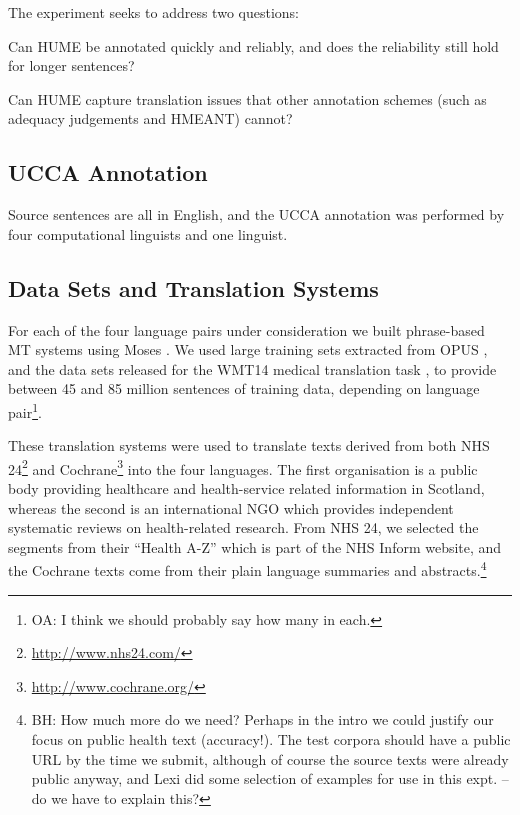 \documentclass[11pt]{article}
\newcommand{\oa}[1]{\footnote{\color{red}OA: #1}}
\newcommand{\bh}[1]{\footnote{\color{blue}BH: #1}}
\begin{document}

The experiment seeks to address two questions:

\begin{compactitem}
\item Can HUME be annotated quickly and reliably, and does the reliability still hold for longer sentences?
\item Can HUME capture translation issues that other annotation schemes (such as
adequacy judgements and HMEANT)
cannot?
\end{compactitem}

\subsection{UCCA Annotation}
Source sentences are all in English, and the UCCA annotation was performed by four
computational linguists and one linguist.

\subsection{Data Sets and Translation Systems}

For each of the four language pairs under consideration  we built phrase-based MT systems
using Moses \cite{Koehn:2007}. We used large training sets extracted from OPUS \cite{tiedemann:2009}, and
the data sets released for the WMT14 medical translation task \cite{bojar-EtAl:2014:W14-33}, to provide between
45 and 85 million sentences of training data, depending on language pair\oa{I think we should probably
  say how many in each.}.

These translation systems were used to translate texts derived from both NHS 24\footnote{\url{http://www.nhs24.com/}} and Cochrane\footnote{\url{http://www.cochrane.org/}} into the four languages. The first organisation is a public body providing healthcare and health-service related information in Scotland, whereas the second is an international NGO which 
provides independent systematic reviews on health-related research. From NHS 24, we selected the segments from their
``Health A-Z'' which is part of the NHS Inform website, and the Cochrane texts come from their plain language summaries
and abstracts.\bh{How much more do we need? Perhaps in the intro we could justify our focus on public health text
(accuracy!). The test corpora should have a public URL by the time we submit, although of course the source texts were 
already public anyway, and Lexi did some selection of examples for use in this expt. -- do we have to explain this?}
\end{document}
